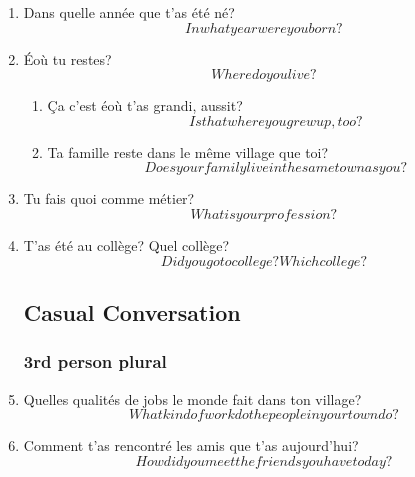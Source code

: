 
\ifdefined \longtrans
\else
  \newcommand{\longtrans}[1]{\[#1\]}
\fi

\begin{enumerate}
  \subsection{Demographics}
    \item Dans quelle année que t'as été né?\\
      \longtrans{In what year were you born?}
    \item Éoù tu restes?\\
      \longtrans{Where do you live?}
    \begin{enumerate}
      \item Ça c'est éoù t'as grandi, aussit?\\
        \longtrans{Is that where you grew up, too?}
      \item Ta famille reste dans le même village que toi?\\
        \longtrans{Does your family live in the same town as you?}
    \end{enumerate}
    \item Tu fais quoi comme métier?\\
      \longtrans{What is your profession?}
    \item T'as été au collège? Quel collège?\\
      \longtrans{Did you go to college? Which college?}
  \subsection{Casual Conversation}
    \subsubsection{3rd person plural}
      \item Quelles qualités de jobs le monde fait dans ton village?\\
        \longtrans{What kind of work do the people in your town do?}
      \item Comment t'as rencontré les amis que t'as aujourd'hui?\\
        \longtrans{How did you meet the friends you have today?}

\end{enumerate}
